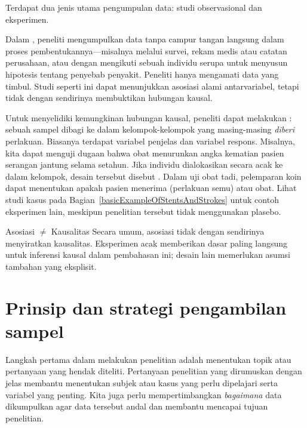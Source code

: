 \noindent%
Terdapat dua jenis utama pengumpulan data:
studi observasional dan eksperimen.

Dalam , peneliti mengumpulkan data tanpa campur
tangan langsung dalam proses pembentukannya---misalnya melalui survei,
rekam medis atau catatan perusahaan, atau dengan mengikuti sebuah
 individu serupa untuk menyusun hipotesis tentang penyebab
penyakit. Peneliti hanya mengamati data yang timbul. Studi seperti ini dapat
menunjukkan asosiasi alami antarvariabel, tetapi tidak dengan sendirinya
membuktikan hubungan kausal.

Untuk menyelidiki kemungkinan hubungan kausal, peneliti dapat melakukan
: sebuah sampel dibagi ke dalam kelompok-kelompok yang
masing-masing \emph{diberi} perlakuan. Biasanya terdapat variabel penjelas dan
variabel respons. Misalnya, kita dapat menguji dugaan bahwa obat menurunkan
angka kematian pasien serangan jantung selama setahun. Jika individu
dialokasikan secara acak ke dalam kelompok, desain tersebut disebut
. Dalam uji obat tadi, pelemparan koin dapat menentukan
apakah pasien menerima  (perlakuan semu) atau obat.
Lihat studi kasus pada
Bagian~\ref{basicExampleOfStentsAndStrokes} untuk contoh eksperimen
lain, meskipun penelitian tersebut tidak menggunakan plasebo.

\begin{onebox}{Asosiasi $\neq$ Kausalitas}
  Secara umum, asosiasi tidak dengan sendirinya menyiratkan kausalitas.
  Eksperimen acak memberikan dasar paling langsung untuk inferensi kausal
  dalam pembahasan ini; desain lain memerlukan asumsi tambahan yang eksplisit.
\end{onebox}


{}




\section{Prinsip dan strategi pengambilan sampel}
\label{overviewOfDataCollectionPrinciples}
\label{section_obs_data_sampling}


Langkah pertama dalam melakukan penelitian adalah menentukan topik
atau pertanyaan yang hendak diteliti.
Pertanyaan penelitian yang dirumuskan dengan jelas membantu menentukan
subjek atau kasus yang perlu dipelajari serta variabel yang penting.
Kita juga perlu mempertimbangkan \emph{bagaimana} data dikumpulkan
agar data tersebut andal dan membantu mencapai tujuan penelitian.


